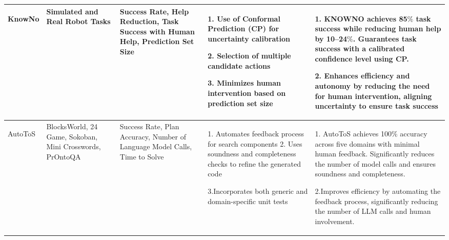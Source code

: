 \begin{table*}[!h]
{\begin{tabular}{|p{2.8cm}|p{2.2cm}|p{3.0cm}|p{5.5cm}|p{6.0cm}|}
\hline
KnowNo \par \cite{ren2023robots} & Simulated and Real Robot Tasks & Success Rate, Help Reduction, Task Success with Human Help, Prediction Set Size & 1. Use of Conformal Prediction (CP) for uncertainty calibration \par 2. Selection of multiple candidate actions \par 3. Minimizes human intervention based on prediction set size & 1. KNOWNO achieves 85$\%$ task success while reducing human help by 10–24$\%$. Guarantees task success with a calibrated confidence level using CP. \par 2. Enhances efficiency and autonomy by reducing the need for human intervention, aligning uncertainty to ensure task success \\

\hline
AutoToS \par \cite{cao2024automating} & BlocksWorld, 24 Game, Sokoban, Mini Crosswords, PrOntoQA & Success Rate, Plan Accuracy, Number of Language Model Calls, Time to Solve & 1. Automates feedback process for search components 2. Uses soundness and completeness checks to refine the generated code \par 3.Incorporates both generic and domain-specific unit tests & 1. AutoToS achieves 100$\%$ accuracy across five domains with minimal human feedback. Significantly reduces the number of model calls and ensures soundness and completeness. \par 2.Improves efficiency by automating the feedback process, significantly reducing the number of LLM calls and human involvement.\\
\hline
\end{tabular}
}
\label{tab:efficiency}
\end{table*}
